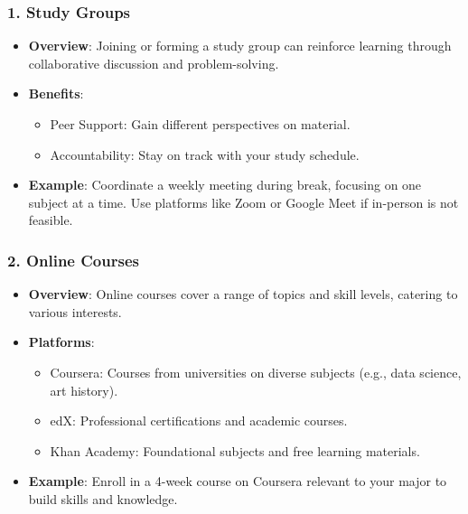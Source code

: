 \documentclass[aspectratio=169]{beamer}
\begin{document}
\begin{frame}[fragile]
    \frametitle{1. Study Groups}
    \begin{itemize}
        \item \textbf{Overview}: Joining or forming a study group can reinforce learning through collaborative discussion and problem-solving.
        \item \textbf{Benefits}:
            \begin{itemize}
                \item Peer Support: Gain different perspectives on material.
                \item Accountability: Stay on track with your study schedule.
            \end{itemize}
        \item \textbf{Example}: Coordinate a weekly meeting during break, focusing on one subject at a time. Use platforms like Zoom or Google Meet if in-person is not feasible.
    \end{itemize}
\end{frame}

\begin{frame}[fragile]
    \frametitle{2. Online Courses}
    \begin{itemize}
        \item \textbf{Overview}: Online courses cover a range of topics and skill levels, catering to various interests.
        \item \textbf{Platforms}:
            \begin{itemize}
                \item Coursera: Courses from universities on diverse subjects (e.g., data science, art history).
                \item edX: Professional certifications and academic courses.
                \item Khan Academy: Foundational subjects and free learning materials.
            \end{itemize}
        \item \textbf{Example}: Enroll in a 4-week course on Coursera relevant to your major to build skills and knowledge.
    \end{itemize}
\end{frame}
\end{document}
